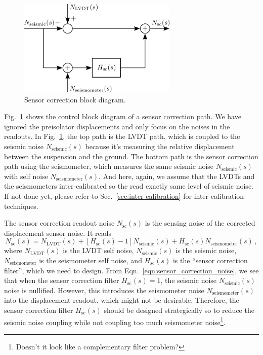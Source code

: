 \begin{figure}
	\centering
	\includegraphics[width=76mm]{figures/sensor_correction}
	\caption{Sensor correction block diagram.}
	\label{fig:sensorcorrection}
\end{figure}
Fig.~\ref{fig:sensorcorrection} shows the control block diagram of a sensor correction path.
We have ignored the preisolator displacements and only focus on the noises in the readouts.
In Fig.~\ref{fig:sensorcorrection}, the top path is the LVDT path, which is coupled to the seismic noise $N_\mathrm{seismic}(s)$ because it's measuring the relative displacement between the suspension and the ground.
The bottom path is the sensor correction path using the seismometer, which measures the same seismic noise $N_\mathrm{seismic}(s)$ with self noise $N_\mathrm{seismometer}(s)$.
And here, again, we assume that the LVDTs and the seismometers inter-calibrated so the read exactly same level of seismic noise.
If not done yet, please refer to Sec.~\ref{sec:inter-calibration} for inter-calibration techniques.

The sensor correction readout noise $N_\mathrm{sc}(s)$ is the sensing noise of the corrected displacement sensor noise.
It reads
\begin{equation}
	N_\mathrm{sc}(s) = N_\mathrm{LVDT}(s) +\left[H_\mathrm{sc}(s)-1\right]N_\mathrm{seismic}(s) + H_\mathrm{sc}(s)N_\mathrm{seismometer}(s)\,,
	\label{eqn:sensor_correction_noise}
\end{equation}
where $N_\mathrm{LVDT}(s)$ is the LVDT self noise, $N_\mathrm{seismic}(s)$ is the seismic noise, $N_\mathrm{seismometer}$ is the seismometer self noise, and $H_\mathrm{sc}(s)$ is the ``sensor correction filter'', which we need to design.
From Eqn.~\eqref{eqn:sensor_correction_noise}, we see that when the sensor correction filter $H_\mathrm{sc}(s)=1$, the seismic noise $N_\mathrm{seismic}(s)$ noise is nullified.
However, this introduces the seismometer noise $N_\mathrm{seismometer}(s)$ into the displacement readout, which might not be desirable.
Therefore, the sensor correction filter $H_\mathrm{sc}(s)$ should be designed strategically so to reduce the seismic noise coupling while not coupling too much seismometer noise\footnote{Doesn't it look like a complementary filter problem?}.

